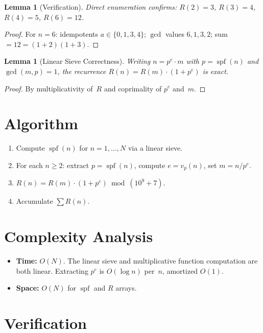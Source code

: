 \documentclass[12pt]{article}
\newtheorem{lemma}[theorem]{Lemma}
\begin{document}
\begin{lemma}[Verification]
Direct enumeration confirms: $R(2) = 3$, $R(3) = 4$, $R(4) = 5$, $R(6) = 12$.
\end{lemma}

\begin{proof}
For $n = 6$: idempotents $a \in \{0,1,3,4\}$; $\gcd$ values $6, 1, 3, 2$; sum $= 12 = (1+2)(1+3)$.
\end{proof}

\begin{lemma}[Linear Sieve Correctness]
Writing $n = p^e \cdot m$ with $p = \operatorname{spf}(n)$ and $\gcd(m,p) = 1$, the recurrence $R(n) = R(m) \cdot (1 + p^e)$ is exact.
\end{lemma}

\begin{proof}
By multiplicativity of~$R$ and coprimality of $p^e$ and~$m$.
\end{proof}

\section{Algorithm}

\begin{enumerate}
\item Compute $\operatorname{spf}(n)$ for $n = 1, \ldots, N$ via a linear sieve.
\item For each $n \geq 2$: extract $p = \operatorname{spf}(n)$, compute $e = v_p(n)$, set $m = n/p^e$.
\item $R(n) = R(m) \cdot (1 + p^e) \bmod (10^9 + 7)$.
\item Accumulate $\sum R(n)$.
\end{enumerate}

\section{Complexity Analysis}

\begin{itemize}
\item \textbf{Time:} $O(N)$. The linear sieve and multiplicative function computation are both linear. Extracting $p^e$ is $O(\log n)$ per~$n$, amortized $O(1)$.
\item \textbf{Space:} $O(N)$ for $\operatorname{spf}$ and $R$ arrays.
\end{itemize}

\section{Verification}
\end{document}
